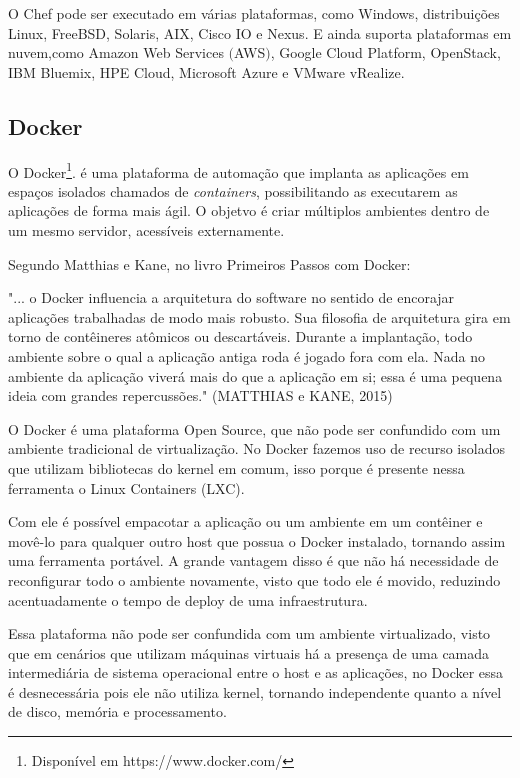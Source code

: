 O Chef pode ser executado em várias plataformas, como Windows, distribuições Linux, FreeBSD, Solaris, AIX, Cisco IO e Nexus. E ainda suporta plataformas em nuvem,como Amazon Web Services $($AWS$)$, Google Cloud Platform, OpenStack, IBM Bluemix, HPE Cloud, Microsoft Azure e VMware vRealize.

\subsection{Docker}

O Docker\footnote{Disponível em https://www.docker.com/}. é uma plataforma de automação que implanta as aplicações em espaços isolados chamados de \textit{containers}, possibilitando as executarem as aplicações de forma mais ágil. O objetvo é criar múltiplos ambientes dentro de um mesmo servidor, acessíveis externamente.

Segundo Matthias e Kane, no livro Primeiros Passos com Docker: 

			\begin{flushright}
				\begin{minipage}{0.75\textwidth}
					\normalsize "... o Docker influencia a arquitetura do software no sentido de encorajar aplicações trabalhadas de modo mais robusto. Sua filosofia de arquitetura gira em torno de contêineres atômicos ou descartáveis. Durante a implantação, todo ambiente sobre o qual a aplicação antiga roda é jogado fora com ela. Nada no ambiente da aplicação viverá mais do que a aplicação em si; essa é uma pequena ideia com grandes repercussões." (MATTHIAS e KANE, 2015)
				\end{minipage}
			\end{flushright}

O Docker é uma plataforma Open Source, que não pode ser confundido com um ambiente tradicional de virtualização. No Docker fazemos uso de recurso isolados que utilizam bibliotecas do kernel em comum, isso porque é presente nessa ferramenta o Linux Containers (LXC).

Com ele é possível empacotar a aplicação ou um ambiente em um contêiner e movê-lo para qualquer outro host que possua o Docker instalado, tornando assim uma ferramenta portável. A grande vantagem disso é que não há necessidade de reconfigurar todo o ambiente novamente, visto que todo ele é movido, reduzindo acentuadamente o tempo de deploy de uma infraestrutura.

Essa plataforma não pode ser confundida com um ambiente virtualizado, visto que em cenários que utilizam máquinas virtuais há a presença de uma camada intermediária de sistema operacional entre o host e as aplicações, no Docker essa é desnecessária pois ele não utiliza kernel, tornando independente quanto a nível de disco, memória e processamento.

